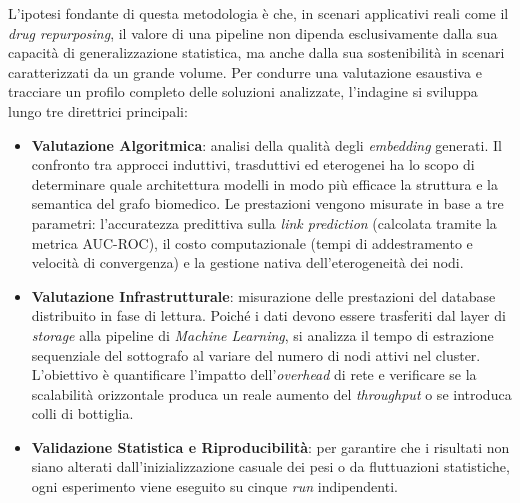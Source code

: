 L'ipotesi fondante di questa metodologia è che, in scenari applicativi reali come il \textit{drug repurposing}, il valore di una pipeline non dipenda esclusivamente dalla sua capacità di generalizzazione statistica, ma anche dalla sua sostenibilità in scenari caratterizzati da un grande volume. Per condurre una valutazione esaustiva e tracciare un profilo completo delle soluzioni analizzate, l'indagine si sviluppa lungo tre direttrici principali:

\begin{itemize}
    \item \textbf{Valutazione Algoritmica}: analisi della qualità degli \textit{embedding} generati. Il confronto tra approcci induttivi, trasduttivi ed eterogenei ha lo scopo di determinare quale architettura modelli in modo più efficace la struttura e la semantica del grafo biomedico. Le prestazioni vengono misurate in base a tre parametri: l'accuratezza predittiva sulla \textit{link prediction} (calcolata tramite la metrica AUC-ROC), il costo computazionale (tempi di addestramento e velocità di convergenza) e la gestione nativa dell'eterogeneità dei nodi.
    
    \item \textbf{Valutazione Infrastrutturale}: misurazione delle prestazioni del database distribuito in fase di lettura. Poiché i dati devono essere trasferiti dal layer di \textit{storage} alla pipeline di \textit{Machine Learning}, si analizza il tempo di estrazione sequenziale del sottografo al variare del numero di nodi attivi nel cluster. L'obiettivo è quantificare l'impatto dell'\textit{overhead} di rete e verificare se la scalabilità orizzontale produca un reale aumento del \textit{throughput} o se introduca colli di bottiglia.
    
    \item \textbf{Validazione Statistica e Riproducibilità}: per garantire che i risultati non siano alterati dall'inizializzazione casuale dei pesi o da fluttuazioni statistiche, ogni esperimento viene eseguito su cinque \textit{run} indipendenti. 
\end{itemize}

